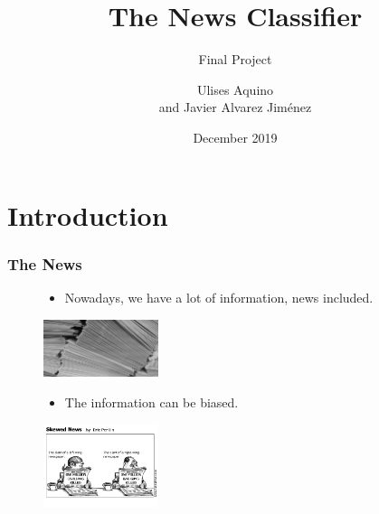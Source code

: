 \documentclass[12pt]{beamer}
\title{The News Classifier}
\subtitle{ Final Project  }
\author{Ulises Aquino \\ and Javier Alvarez Jiménez}
\institute[IH]{IronHack \\
Mexico }
\date{December 2019}
\begin{document}
\frame{\titlepage}





\section{Introduction}

\begin{frame}

\frametitle{The News}
\begin{figure}  \label{fig:papers}
  
	\begin{itemize}
	\item Nowadays, we have a lot of information, news included.
	\end{itemize}  
  
   \includegraphics[width=0.3\textwidth]{muchpaper.jpg}
  \label{fig:papers}
\end{figure}

\begin{figure}  \label{fig:bias}
  
	\begin{itemize}
	\item The information can be biased.
	\end{itemize}  
  
   \includegraphics[width=0.3\textwidth]{bias.png}
  \label{fig:bias}
\end{figure}





\end{frame}
\end{document}
